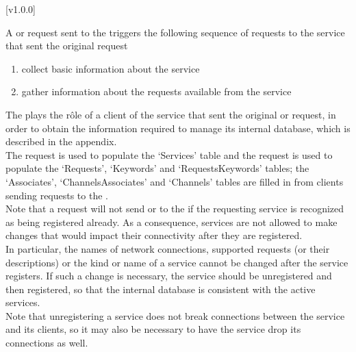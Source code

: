 [v1.0.0]

A  or
 request sent to the
 triggers the following sequence of
requests to the service that sent the original request \longDash{}
\begin{enumerate}
\item\textbf{} collect basic information about the
service
\item\textbf{} gather information about the requests
available from the service
\end{enumerate}
The  plays the r\^ole of a client of the
service that sent the original 
or  request, in order to obtain the
information required to manage its internal database, which is described in the
 appendix.\\

The  request is used to populate the `Services' table
and the  request is used to populate the `Requests',
`Keywords' and `RequestsKeywords' tables; the `Associates', `ChannelsAssociates' and
`Channels' tables are filled in from clients sending 
 requests to the
.\\

Note that a  request will not
send  or  to the
 if the requesting service is recognized
as being registered already.
As a consequence, services are not allowed to make changes that would impact their
connectivity after they are registered.\\

In particular, the names of \yarp{} network connections, supported requests (or their
descriptions) or the kind or name of a service cannot be changed after the service
registers.
If such a change is necessary, the service should be unregistered and then registered, so
that the internal database is consistent with the active services.\\

Note that unregistering a service does not break connections between the service and its
clients, so it may also be necessary to have the service drop its connections as well.
\appendixEnd{}
